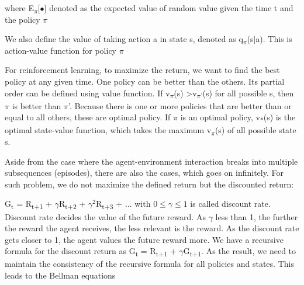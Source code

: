 \documentclass[11pt]{article}
\begin{document}
where E\textsubscript{$\pi$}[$\bullet$] denoted as the expected value of random value given the time t and the policy $\pi$

We also define the value of taking action a in state s, denoted as q\textsubscript{$\pi$}(s$\vert$a).
This is action-value function for policy $\pi$

For reinforcement learning, to maximize the return, we want to find the best policy at any given time. One policy can be better than the others. Its partial order can be defined using value function. If v\textsubscript{$\pi$}(s) >v\textsubscript{$\pi$'}(s) for all possible s, then $\pi$ is better than $\pi$'. Because there is one or more policies that are better than or equal to all others, these are optimal policy. If $\pi$ is an optimal policy, v\textsubscript{*}(s) is the optimal state-value function, which takes the maximum v\textsubscript{$\pi$}(s) of all possible state s.

Aside from the case where the agent-environment interaction breaks into multiple subsequences (episodes), there are also the cases, which goes on infinitely. For such problem, we do not maximize the defined return but the discounted return:

G\textsubscript{t} = R\textsubscript{t+1} + $\gamma$R\textsubscript{t+2} + $\gamma^{2}$R\textsubscript{t+3} + ... with $0 \leq \gamma \leq 1$ is called discount rate. Discount rate decides the value of the future reward. As $\gamma$ less than 1, the further the reward the agent receives, the less relevant is the reward. As the discount rate gets closer to 1, the agent values the future reward more. We have a recursive formula for the discount return as G\textsubscript{t} = R\textsubscript{t+1} + $\gamma$G\textsubscript{t+1}. As the result, we need to maintain the consistency of the recursive formula for all policies and states. This leads to the Bellman equations




\end{document}
